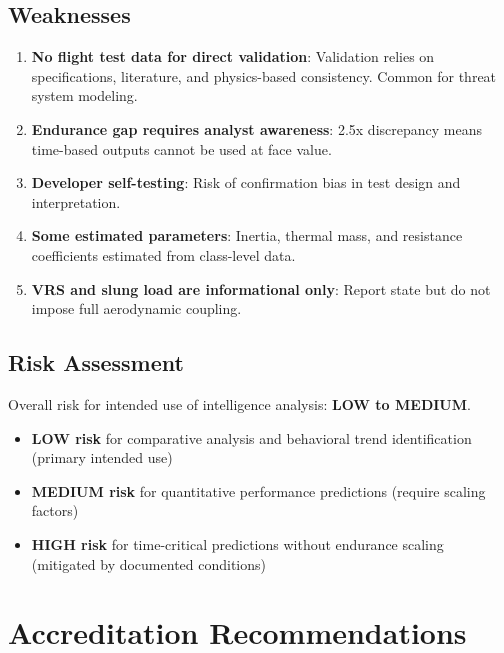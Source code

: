 \documentclass[11pt, letterpaper]{article}
\begin{document}
\subsection{\unclass Weaknesses}

\begin{enumerate}
    \item \unclass \textbf{No flight test data for direct validation}: Validation relies on specifications, literature, and physics-based consistency. Common for threat system modeling.
    \item \unclass \textbf{Endurance gap requires analyst awareness}: 2.5x discrepancy means time-based outputs cannot be used at face value.
    \item \unclass \textbf{Developer self-testing}: Risk of confirmation bias in test design and interpretation.
    \item \unclass \textbf{Some estimated parameters}: Inertia, thermal mass, and resistance coefficients estimated from class-level data.
    \item \unclass \textbf{VRS and slung load are informational only}: Report state but do not impose full aerodynamic coupling.
\end{enumerate}

\subsection{\unclass Risk Assessment}

\unclass Overall risk for intended use of intelligence analysis: \textbf{LOW to MEDIUM}.

\begin{itemize}
    \item \unclass \textbf{LOW risk} for comparative analysis and behavioral trend identification (primary intended use)
    \item \unclass \textbf{MEDIUM risk} for quantitative performance predictions (require scaling factors)
    \item \unclass \textbf{HIGH risk} for time-critical predictions without endurance scaling (mitigated by documented conditions)
\end{itemize}

\pagebreak


\section{\unclass Accreditation Recommendations}
\end{document}
